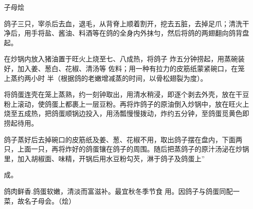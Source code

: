 \begin{recipe}{子母烩}

\ingredients


\cooking

\step 鸽子三只，宰杀后去血，退毛，从背脊上顺着割开，挖去五脏，去掉足爪；清洗干净后，用手将盐、酱油、料酒等在鸽的全身内外抹勻，然后将鸽的两翅翻向鸽背盘起。

在炒锅内放入猪油置于旺火上烧至七、八成热，将鸽子 炸五分钟捞起，用蒸碗装好，加入姜、葱白、花椒、清汤等 佐料；用一种有拉力的皮筋纸蒙紧碗口，在笼上蒸约两小时 半（根据鸽的老嫩增减蒸的时间，以骨松翅裂为度）。

\step 将鸽蛋连壳在笼上蒸熟，约一刻钟取出，用清水稍浸，即逐个剥去外壳，放在干豆粉上滚动，使鸽蛋上都裹上一层豆粉。再将炸鸽子的原油倒入炒锅中，放在旺火上烧至五成热，把鸽蛋顺锅边投入，用汤瓢慢慢拨动，炸约五分钟，至鸽蛋觅黄色即捞起待用。

\step 鸽子蒸好后去掉碗口的皮筋纸及姜、葱、花椒不用，取出鸽子摆在盘内，下面两只，上面一只，再将炸好的鸽蛋镶在鸽子的周围。随后把蒸鸽子的原汁汤泌在炒锅里，加入胡椒面、味精，开锅后用水豆粉勾芡，淋于鸽子及鸽蛋上”

成。

\notes

鸽肉鲜香.鸽蛋软嫩，清淡而富滋补。最宜秋冬季节食 用。因鸽子与鸽蛋同配一菜，故名子母会。（烩）

\end{recipe}

